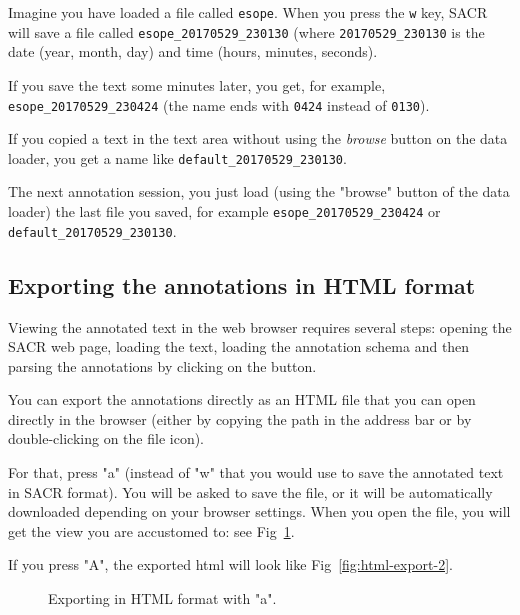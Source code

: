 \documentclass[12pt]{article}
\begin{document}
Imagine you have loaded a file called \verb|esope|.  When you press the
\verb|w| key, SACR will save a file called \verb|esope_20170529_230130|
(where \verb|20170529_230130| is the date (year, month, day) and time (hours,
minutes, seconds).

If you save the text some minutes later, you get, for example,
\verb|esope_20170529_230424| (the name ends with \verb|0424| instead of
\verb|0130|).

If you copied a text in the text area without using the \emph{browse} button
on the data loader, you get a name like \verb|default_20170529_230130|.

The next annotation session, you just load (using the "browse" button of the
data loader) the last file you saved, for example
\verb|esope_20170529_230424| or \verb|default_20170529_230130|.


 \subsection{Exporting the annotations in HTML format}

Viewing the annotated text in the web browser requires several steps: opening
the SACR web page, loading the text, loading the annotation schema and then
parsing the annotations by clicking on the button.

You can export the annotations directly as an HTML file that you can open
directly in the browser (either by copying the path in the address bar or by
double-clicking on the file icon).

For that, press "a" (instead of "w" that you would use to save the annotated
text in SACR format). You will be asked to save the file, or it will be
automatically downloaded depending on your browser settings.  When you open
the file, you will get the view you are accustomed to: see
Fig~\ref{fig:html-export-1}.

If you press "A", the exported html will look like
Fig~\ref{fig:html-export-2}.

\begin{figure}
\begin{center}
\end{center}
\caption{Exporting in HTML format with "a".}
\label{fig:html-export-1}
\end{figure}
\end{document}
